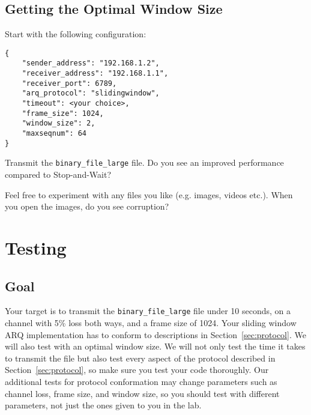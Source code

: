 \documentclass[11pt]{article}
\begin{document}
\subsection{Getting the Optimal Window Size}
Start with the following configuration:
\begin{lstlisting}[style=ece361-shell-base, caption={Sliding Window Configuration}]
{
    "sender_address": "192.168.1.2",
    "receiver_address": "192.168.1.1",
    "receiver_port": 6789,
    "arq_protocol": "slidingwindow",
    "timeout": <your choice>,
    "frame_size": 1024,
    "window_size": 2,
    "maxseqnum": 64
}
\end{lstlisting}

Transmit the \texttt{binary\_file\_large} file.
Do you see an improved performance compared to Stop-and-Wait?

Feel free to experiment with any files you like (e.g. images, videos etc.). When you open the images, do you see corruption?

\section{Testing}

\subsection{Goal}
Your target is to transmit the \texttt{binary\_file\_large} file under 10 seconds, on a channel with 5\% loss both ways, and a frame size of 1024.
Your sliding window ARQ implementation has to conform to descriptions in Section~\ref{sec:protocol}.
We will also test with an optimal window size.
We will not only test the time it takes to transmit the file but also test every aspect of the protocol described in Section~\ref{sec:protocol}, so make sure you test your code thoroughly.
Our additional tests for protocol conformation may change parameters such as channel loss, frame size, and window size, so you should test with different parameters, not just the ones given to you in the lab.
\end{document}
